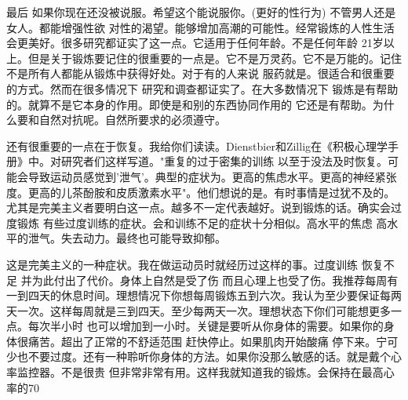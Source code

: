 最后 如果你现在还没被说服。希望这个能说服你。(更好的性行为) 不管男人还是女人。都能增强性欲 对性的渴望。能够增加高潮的可能性。经常锻炼的人性生活会更美好。很多研究都证实了这一点。它适用于任何年龄。不是任何年龄 21岁以上。但是关于锻炼要记住的很重要的一点是。它不是万灵药。它不是万能的。记住不是所有人都能从锻炼中获得好处。对于有的人来说 服药就是。很适合和很重要的方式。然而在很多情况下 研究和调查都证实了。在大多数情况下 锻炼是有帮助的。就算不是它本身的作用。即使是和别的东西协同作用的 它还是有帮助。为什么要和自然对抗呢。自然所要求的必须遵守。 

还有很重要的一点在于恢复。我给你们读读。Dienstbier和Zillig在《积极心理学手册》中。对研究者们这样写道。"重复的过于密集的训练 以至于没法及时恢复。可能会导致运动员感觉到'泄气'。典型的症状为。更高的焦虑水平。更高的神经紧张度。更高的儿茶酚胺和皮质激素水平"。他们想说的是。有时事情是过犹不及的。尤其是完美主义者要明白这一点。越多不一定代表越好。说到锻炼的话。确实会过度锻炼 有些过度训练的症状。会和训练不足的症状十分相似。高水平的焦虑 高水平的泄气。失去动力。最终也可能导致抑郁。 

这是完美主义的一种症状。我在做运动员时就经历过这样的事。过度训练 恢复不足 并为此付出了代价。身体上自然是受了伤 而且心理上也受了伤。我推荐每周有一到四天的休息时间。理想情况下你想每周锻炼五到六次。我认为至少要保证每两天一次。这样每周就是三到四天。至少每两天一次。理想状态下你们可能想更多一点。每次半小时 也可以增加到一小时。关键是要听从你身体的需要。如果你的身体很痛苦。超出了正常的不舒适范围 赶快停止。如果肌肉开始酸痛 停下来。宁可少也不要过度。还有一种聆听你身体的方法。如果你没那么敏感的话。就是戴个心率监控器。不是很贵 但非常非常有用。这样我就知道我的锻炼。会保持在最高心率的70%

